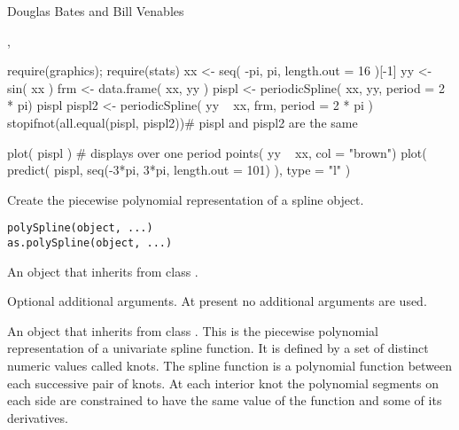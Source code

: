 %
\begin{Author}\relax
Douglas Bates and Bill Venables
\end{Author}
%
\begin{SeeAlso}\relax
{},
\end{SeeAlso}
%
\begin{Examples}
\begin{ExampleCode}
require(graphics); require(stats)
xx <- seq( -pi, pi, length.out = 16 )[-1]
yy <- sin( xx )
frm <- data.frame( xx, yy )
pispl <- periodicSpline( xx, yy, period = 2 * pi)
pispl
pispl2 <- periodicSpline( yy ~ xx, frm, period = 2 * pi )
stopifnot(all.equal(pispl, pispl2))# pispl and pispl2 are the same

plot( pispl )          # displays over one period
points( yy ~ xx, col = "brown")
plot( predict( pispl, seq(-3*pi, 3*pi, length.out = 101) ), type = "l" )
\end{ExampleCode}
\end{Examples}
%
\begin{Description}\relax
Create the piecewise polynomial representation of a spline object.
\end{Description}
%
\begin{Usage}
\begin{verbatim}
polySpline(object, ...)
as.polySpline(object, ...)
\end{verbatim}
\end{Usage}
%
\begin{Arguments}
\begin{ldescription}
\item[\code{object}] An object that inherits from class .
\item[\code{...}] Optional additional arguments.  At present no additional
arguments are used.
\end{ldescription}
\end{Arguments}
%
\begin{Value}
An object that inherits from class .  This is the
piecewise polynomial representation of a univariate spline function.
It is defined by a set of distinct numeric values called knots.  The
spline function is a polynomial function between each successive pair
of knots.  At each interior knot the polynomial segments on each side
are constrained to have the same value of the function and some of its
derivatives.
\end{Value}
